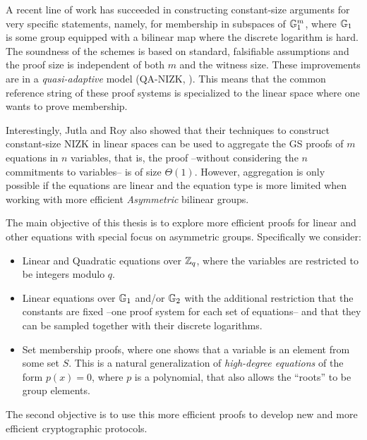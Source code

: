 A recent line of work 
  \cite{AC:JutRoy13,C:JutRoy14,EC:KilWee15,EC:LPJY14} 
has succeeded in constructing constant-size  
  arguments for very specific statements, namely, for membership in subspaces of $\mathbb{G}_1^{m}$, 
  where $\mathbb{G}_1$ is some group equipped with a bilinear map where the discrete logarithm is hard. 
The soundness of the schemes is based on standard, falsifiable assumptions 
  and the proof size is independent of both $m$ and the witness size.  These improvements are in a  \textit{quasi-adaptive} 
  model (QA-NIZK, \cite{AC:JutRoy13}).  This means that the common reference string of these proof systems is 
  specialized to the linear space where one wants to prove membership.
  
Interestingly, Jutla and Roy  \cite{C:JutRoy14} also showed that their techniques to construct 
  constant-size NIZK in linear spaces can be used to aggregate the GS proofs of $m$ equations in $n$ variables, that is, the proof --without considering the $n$ commitments to variables-- is of size $\Theta(1)$. However, aggregation is only possible if the equations are linear and the equation type is more limited when working with more efficient \emph{Asymmetric} bilinear groups. 

The main objective of this thesis is to explore more efficient proofs for linear and other equations with special focus on asymmetric groups. Specifically we consider:
\begin{itemize}
\item Linear and Quadratic equations over $\mathbb{Z}_q$, where the variables are restricted to be integers modulo $q$.
\item Linear equations over $\mathbb{G}_1$ and/or $\mathbb{G}_2$ with the additional restriction that the constants are fixed --one proof system for each set of equations-- and that they 
can be sampled together with their discrete logarithms.
\item Set membership proofs, where one shows that a variable is an element from some set $S$. This is a natural generalization of \emph{high-degree equations} of the form $p(x)=0$, where $p$ is a polynomial, that also allows the ``roots'' to be group elements.
\end{itemize}
The second objective is to use this more efficient proofs to develop new and more efficient cryptographic protocols.
